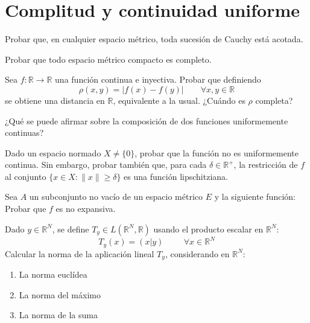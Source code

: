 \section{Complitud y continuidad uniforme}

\begin{ejercicio}
    Probar que, en cualquier espacio métrico, toda sucesión de Cauchy está acotada.
    \end{ejercicio}
    
    \begin{ejercicio}
    Probar que todo espacio métrico compacto es completo.
    \end{ejercicio}
    
    \begin{ejercicio}
    Sea \( f : \mathbb{R} \rightarrow \mathbb{R} \) una función continua e inyectiva. Probar que definiendo
    \[
    \rho(x,y) = |f(x) - f(y)| \qquad \forall x, y \in \mathbb{R}
    \]
    se obtiene una distancia en \( \mathbb{R} \), equivalente a la usual. ¿Cuándo es \( \rho \) completa?
    \end{ejercicio}
    
    \begin{ejercicio}
    ¿Qué se puede afirmar sobre la composición de dos funciones uniformemente continuas?
    \end{ejercicio}
    
    \begin{ejercicio}
    Dado un espacio normado \( X \neq \{0\} \), probar que la función
    no es uniformemente continua. Sin embargo, probar también que, para cada \( \delta \in \mathbb{R}^+ \), la restricción de \( f \) al conjunto \( \{ x \in X : \|x\| \geq \delta \} \) es una función lipschitziana.
    \end{ejercicio}
    
    \begin{ejercicio}
    Sea \( A \) un subconjunto no vacío de un espacio métrico \( E \) y la siguiente función:
    Probar que \( f \) es no expansiva.
    \end{ejercicio}
    
    \begin{ejercicio}
    Dado \( y \in \mathbb{R}^N \), se define \( T_y \in L(\mathbb{R}^N, \mathbb{R}) \) usando el producto escalar en \( \mathbb{R}^N \):
    \[
    T_y(x) = \left( x | y \right) \hspace{1cm} \forall x \in \mathbb{R}^N 
    \]
    Calcular la norma de la aplicación lineal \( T_y \), considerando en \( \mathbb{R}^N \):
    \begin{enumerate}
        \item La norma euclídea
        \item La norma del máximo
        \item La norma de la suma
    \end{enumerate}
    \end{ejercicio}
    
